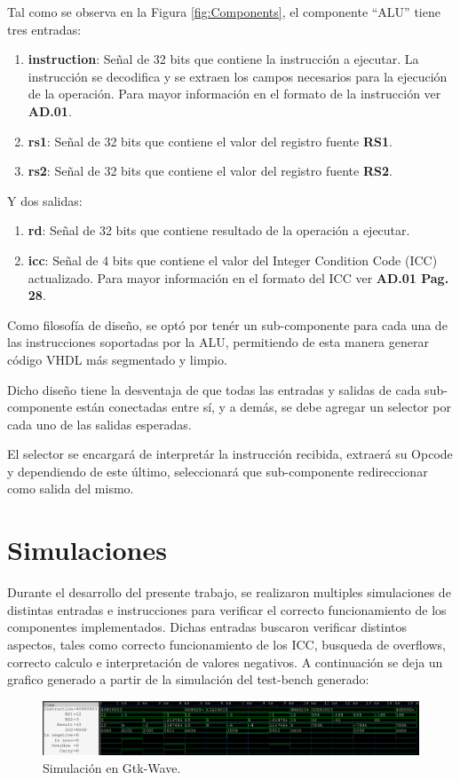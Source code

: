 \documentclass[
  11pt, %
  codirector, %
]{charter}
\begin{document}
\vspace{25px}

Tal como se observa en la Figura \ref{fig:Components}, el componente ``ALU''
tiene tres entradas:

\begin{enumerate}
\item \textbf{instruction}: Señal de 32 bits que contiene la instrucción a
  ejecutar. La instrucción se decodifica y se extraen los campos necesarios para
  la ejecución de la operación. Para mayor información en el formato de la
  instrucción ver \textbf{AD.01}.
\item \textbf{rs1}: Señal de 32 bits que contiene el valor del registro fuente
  \textbf{RS1}.
\item \textbf{rs2}: Señal de 32 bits que contiene el valor del registro fuente
  \textbf{RS2}.
\end{enumerate}

Y dos salidas:

\begin{enumerate}
\item \textbf{rd}: Señal de 32 bits que contiene resultado de la operación a ejecutar.
\item \textbf{icc}: Señal de 4 bits que contiene el valor del Integer Condition
  Code (ICC) actualizado. Para mayor información en el formato del ICC ver
  \textbf{AD.01 Pag. 28}.
\end{enumerate}

Como filosofía de diseño, se optó por tenér un sub-componente para cada una de
las instrucciones soportadas por la ALU, permitiendo de esta manera generar
código VHDL más segmentado y limpio.

Dicho diseño tiene la desventaja de que todas las entradas y salidas de cada
sub-componente están conectadas entre sí, y a demás, se debe agregar un selector
por cada uno de las salidas esperadas.

El selector se encargará de interpretár la instrucción recibida, extraerá su
Opcode y dependiendo de este último, seleccionará que sub-componente
redireccionar como salida del mismo.

\section{Simulaciones}
\label{sec:orgf3b3b3b}

Durante el desarrollo del presente trabajo, se realizaron multiples simulaciones de distintas entradas e instrucciones para verificar el correcto funcionamiento de los componentes implementados. Dichas entradas buscaron verificar distintos aspectos, tales como correcto funcionamiento de los ICC, busqueda de overflows, correcto calculo e interpretación de valores negativos. A continuación se deja un grafico generado a partir de la simulación del test-bench generado:


\begin{figure}[htpb]
  \centering
  \includegraphics[width=1\textwidth]{./Figuras/gtkwave.png}
  \caption{Simulación en Gtk-Wave.}
  \label{fig:gtkwave}
\end{figure}

\vspace{25px}
\end{document}
